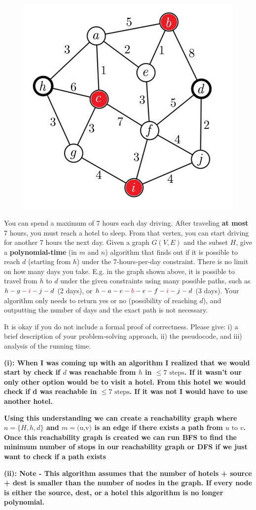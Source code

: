 \documentclass[addpoints]{exam}
\begin{document}
\begin{questions}
\begin{figure}[h!]
    \centering
    \includegraphics[width=0.35\linewidth]{hotels.png}
\end{figure}

You can spend a maximum of 7 hours each day driving. After traveling \textbf{at most} 7 hours, you must reach a hotel to sleep. From that vertex, you can start driving for another 7 hours the next day. Given a graph $G(V,E)$ and the subset $H$, give a \textbf{polynomial-time} (in $m$ and $n$) algorithm that finds out if it is possible to reach $d$ (starting from $h$) under the 7-hours-per-day constraint. There is no limit on how many days you take. E.g. in the graph shown above, it is possible to travel from $h$ to $d$ under the given constraints using many possible paths, such as $h-g-\textcolor{red}{i}-j-d$ (2 days), or $h-a-e-\textcolor{red}{b}-e-f-\textcolor{red}{i}-j-d$ (3 days). Your algorithm only needs to return yes or no (possibility of reaching $d$), and outputting the number of days and the exact path is not necessary.

It is okay if you do not include a formal proof of correctness. Please give: i) a brief description of your problem-solving approach, ii) the pseudocode, and iii) analysis of the running time. 

\textbf{(i): When I was coming up with an algorithm I realized that we would start by check if $d$ was reachable from $h$ in $\le 7 \text{ steps}$. If it wasn't our only other option would be to visit a hotel. From this hotel we would check if d was reachable in $\le 7 \text{ steps}$. If it was not I would have to use another hotel.}

\textbf{Using this understanding we can create a reachability graph where $n = \{H,h,d\} $ and $m = \text{(u,v)}$ is an edge if there exists a path from $u \text{ to } v$. Once this reachability graph is created we can run BFS to find the minimum number of stops in our reachability graph or DFS if we just want to check if a path exists}

\textbf{(ii): Note - This algorithm assumes that the number of hotels + source + dest is smaller than the number of nodes in the graph. If every node is either the source, dest, or a hotel this algorithm is no longer polynomial.}


\end{questions}
\end{document}
